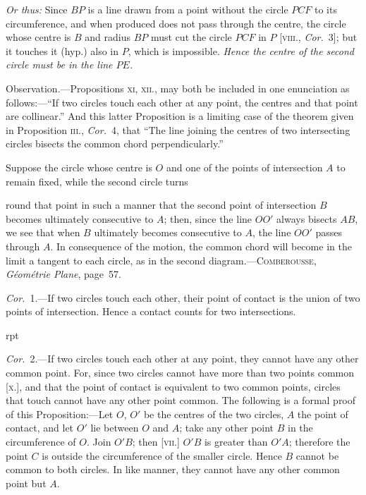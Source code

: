 \documentclass[oneside]{book}
\newcounter{wrapwidth}
\newcommand\imgflow[3]{
\setcounter{wrapwidth}{#1}

\begin{wrapfigure}[#2]{r}{\value{wrapwidth}pt}
\begin{center}
\vspace{-0.3in}

\end{center}
\end{wrapfigure}
}
\newcommand\imgcent[2]{
\begin{center}

\end{center}
}
\begin{document}
\textit{Or thus:} Since $BP$ is a line drawn from a point without
the circle $PCF$ to its circumference, and when produced
does not pass through the centre, the circle
whose centre is $B$ and radius $BP$ must cut the circle
$PCF$ in $P$ [\textsc{viii.}, \textit{Cor.}~3]; but it touches it (hyp.) also
in $P$, which is impossible. \textit{Hence the centre of the
second circle must be in the line $PE$.}\par\medskip

\begin{footnotesize}
\textsf{Observation.}---Propositions \textsc{xi, xii.}, may both be included in
one enunciation as follows:---``If two circles touch each other at
any point, the centres and that point are collinear.'' And this
latter Proposition is a limiting case of the theorem given in Proposition \textsc{iii.},
\textit{Cor.}~4, that ``The line joining the centres of two
intersecting circles bisects the common chord perpendicularly.''


\imgcent{313}{f116}

Suppose the circle whose centre is $O$ and one of the points of
intersection $A$ to remain fixed, while the second circle turns

round that point in such a manner that the second point of
intersection $B$ becomes ultimately consecutive to $A$; then, since
the line $OO'$ always bisects $AB$, we see that when $B$ ultimately
becomes consecutive to $A$, the line $OO'$ passes through $A$. In
consequence of the motion, the common chord will become in
the limit a tangent to each circle, as in the second diagram.---\textsc{Comberousse},
\textit{G\'eom\'etrie Plane}, page~57.

\textit{Cor.}~1.---If two circles touch each other, their point of contact
is the union of two points of intersection. Hence a contact
counts for two intersections.

\newpage

\imgflow{100}{9}{f117}
\textit{Cor.}~2.---If two circles touch each other at any point, they
cannot have any other common point. For, since two circles
cannot have more than two points
common [\textsc{x.}], and that the point of contact
is equivalent to two common points,
circles that touch cannot have any
other point common. The following is
a formal proof of this Proposition:---Let
$O$, $O'$ be the centres of the two circles,
$A$ the point of contact, and let $O'$ lie
between $O$ and $A$; take any other point
$B$ in the circumference of $O$. Join $O'B$;
then [\textsc{vii.}] $O'B$ is greater than $O'A$; therefore the point $C$ is
outside the circumference of the smaller circle. Hence $B$ cannot
be common to both circles. In like manner, they cannot have
any other common point but $A$.
\par\end{footnotesize}
\end{document}
